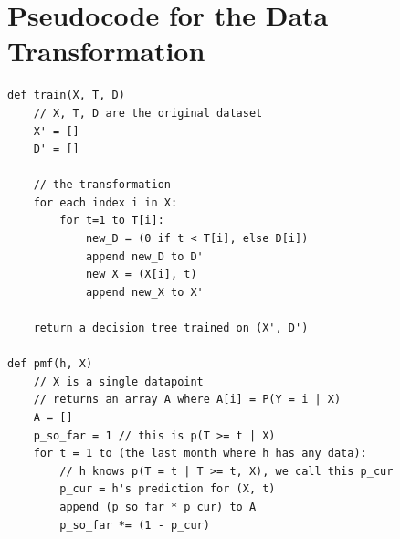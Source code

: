 \documentclass[a4paper,11pt]{article}
\begin{document}
\appendix
\section{Pseudocode for the Data Transformation}
\label{subsec:pseudocode}

\begin{verbatim}
def train(X, T, D)
    // X, T, D are the original dataset
    X' = []
    D' = []

    // the transformation
    for each index i in X:
        for t=1 to T[i]:
            new_D = (0 if t < T[i], else D[i])
            append new_D to D'
            new_X = (X[i], t)
            append new_X to X'

    return a decision tree trained on (X', D')

def pmf(h, X)
    // X is a single datapoint
    // returns an array A where A[i] = P(Y = i | X)
    A = []
    p_so_far = 1 // this is p(T >= t | X)
    for t = 1 to (the last month where h has any data):
        // h knows p(T = t | T >= t, X), we call this p_cur
        p_cur = h's prediction for (X, t)
        append (p_so_far * p_cur) to A
        p_so_far *= (1 - p_cur)

\end{verbatim}


%
%


\end{document}
